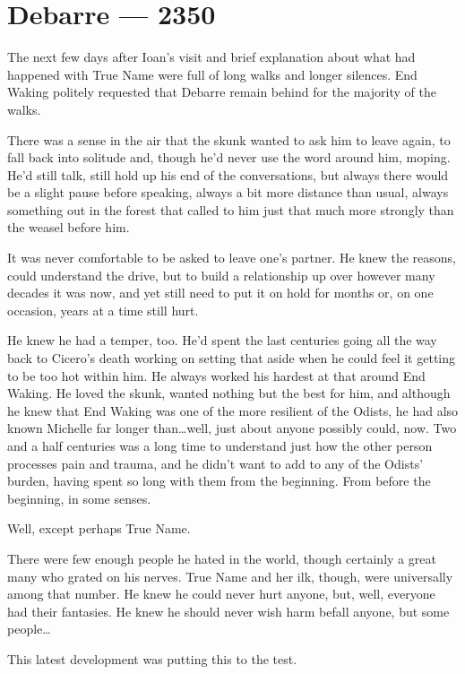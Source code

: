 \hypertarget{debarre-2350}{%
\chapter{Debarre — 2350}\label{debarre-2350}}

The next few days after Ioan's visit and brief explanation about what had happened with True Name were full of long walks and longer silences. End Waking politely requested that Debarre remain behind for the majority of the walks.

There was a sense in the air that the skunk wanted to ask him to leave again, to fall back into solitude and, though he'd never use the word around him, moping. He'd still talk, still hold up his end of the conversations, but always there would be a slight pause before speaking, always a bit more distance than usual, always something out in the forest that called to him just that much more strongly than the weasel before him.

It was never comfortable to be asked to leave one's partner. He knew the reasons, could understand the drive, but to build a relationship up over however many decades it was now, and yet still need to put it on hold for months or, on one occasion, years at a time still hurt.

He knew he had a temper, too. He'd spent the last centuries going all the way back to Cicero's death working on setting that aside when he could feel it getting to be too hot within him. He always worked his hardest at that around End Waking. He loved the skunk, wanted nothing but the best for him, and although he knew that End Waking was one of the more resilient of the Odists, he had also known Michelle far longer than\ldots well, just about anyone possibly could, now. Two and a half centuries was a long time to understand just how the other person processes pain and trauma, and he didn't want to add to any of the Odists' burden, having spent so long with them from the beginning. From before the beginning, in some senses.

Well, except perhaps True Name.

There were few enough people he hated in the world, though certainly a great many who grated on his nerves. True Name and her ilk, though, were universally among that number. He knew he could never hurt anyone, but, well, everyone had their fantasies. He knew he should never wish harm befall anyone, but some people\ldots{}

This latest development was putting this to the test.

